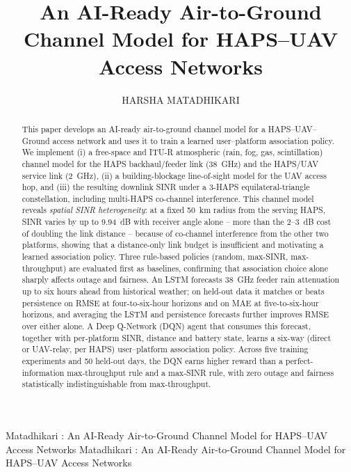 \documentclass[]{ieeeaccess}
\begin{document}

\title{An AI-Ready Air-to-Ground Channel Model for HAPS--UAV Access Networks}

\author{\uppercase{Harsha Matadhikari}}

\address[1]{PG Diploma in Advanced Communication Engineering with Quantum AI Integration, Indian Institute of Technology Delhi, New Delhi, India (e-mail: harsha.matadhikari@gmail.com)}


\markboth
{Matadhikari \headeretal: An AI-Ready Air-to-Ground Channel Model for HAPS--UAV Access Networks}
{Matadhikari \headeretal: An AI-Ready Air-to-Ground Channel Model for HAPS--UAV Access Networks}


\begin{abstract}
This paper develops an AI-ready air-to-ground channel model for a HAPS--UAV--Ground access network and uses it to train a learned user--platform association policy. We implement (i) a free-space and ITU-R atmospheric (rain, fog, gas, scintillation) channel model for the HAPS backhaul/feeder link (38~GHz) and the HAPS/UAV service link (2~GHz), (ii) a building-blockage line-of-sight model for the UAV access hop, and (iii) the resulting downlink SINR under a 3-HAPS equilateral-triangle constellation, including multi-HAPS co-channel interference. This channel model reveals \emph{spatial SINR heterogeneity}: at a fixed 50~km radius from the serving HAPS, SINR varies by up to 9.94~dB with receiver angle alone -- more than the 2--3~dB cost of doubling the link distance -- because of co-channel interference from the other two platforms, showing that a distance-only link budget is insufficient and motivating a learned association policy. Three rule-based policies (random, max-SINR, max-throughput) are evaluated first as baselines, confirming that association choice alone sharply affects outage and fairness. An LSTM forecasts 38~GHz feeder rain attenuation up to six hours ahead from historical weather; on held-out data it matches or beats persistence on RMSE at four-to-six-hour horizons and on MAE at five-to-six-hour horizons, and averaging the LSTM and persistence forecasts further improves RMSE over either alone. A Deep Q-Network (DQN) agent that consumes this forecast, together with per-platform SINR, distance and battery state, learns a six-way (direct or UAV-relay, per HAPS) user--platform association policy. Across five training experiments and 50 held-out days, the DQN earns higher reward than a perfect-information max-throughput rule and a max-SINR rule, with zero outage and fairness statistically indistinguishable from max-throughput.
\end{abstract}
\end{document}
